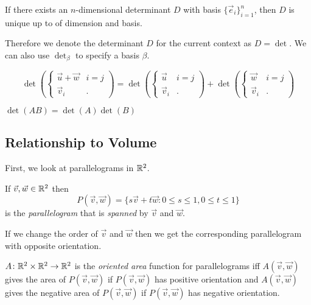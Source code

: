 \documentclass[notes]{subfiles}
\begin{document}
\begin{lemma}
    If there exists an $n$-dimensional determinant $D$ with basis $\{ \vec{e}_i \}_{i = 1}^n$, then $D$ is unique up to of dimension and basis.
\end{lemma}

Therefore we denote the determinant $D$ for the current context as $D = \det$. We can also use $\det_\beta$ to specify a basis $\beta$.

\begin{theorem} \label{det_additive}
    \[
        \det\left( \begin{cases}
            \vec{u} + \vec{w} & i = j \\
            \vec{v}_i & .
        \end{cases} \right)
        =
        \det\left( \begin{cases}
            \vec{u} & i = j \\
            \vec{v}_i & .
        \end{cases} \right)
        +
        \det\left( \begin{cases}
            \vec{w} & i = j \\
            \vec{v}_i & .
        \end{cases} \right)
    \]
\end{theorem}

\begin{lemma}
    $\det(AB) = \det(A)\det(B)$
\end{lemma}

\subsection{Relationship to Volume}
First, we look at parallelograms in $\mathbb{R}^2$.

\begin{definition}[Parallelogram]
    If $\vec{v}, \vec{w} \in \mathbb{R}^2$ then
    \[
        P(\vec{v}, \vec{w}) = \{ s\vec{v} + t\vec{w} : 0 \leq s \leq 1, 0 \leq t \leq 1 \}
    \]
    is the \textit{parallelogram} that is \textit{spanned} by $\vec{v}$ and $\vec{w}$.
\end{definition}

If we change the order of $\vec{v}$ and $\vec{w}$ then we get the corresponding parallelogram with opposite orientation.

\begin{definition}
    $A\colon \mathbb{R}^2 \times \mathbb{R}^2 \to \mathbb{R}^2$ is the \textit{oriented area} function for parallelograms iff $A(\vec{v}, \vec{w})$ gives the area of $P(\vec{v}, \vec{w})$ if $P(\vec{v}, \vec{w})$ has positive orientation and $A(\vec{v}, \vec{w})$ gives the negative area of $P(\vec{v}, \vec{w})$ if $P(\vec{v}, \vec{w})$ has negative orientation.
\end{definition}
\end{document}
